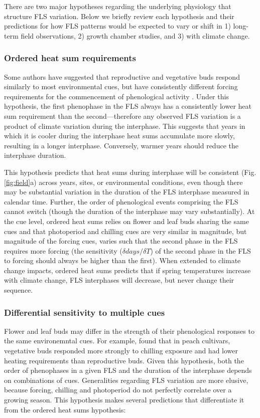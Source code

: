 \documentclass[11pt]{article}
\begin{document}
\noindent There are two major hypotheses regarding the underlying physiology that structure FLS variation. Below we briefly review each hypothesis and their predictions for how FLS patterns would be expected to vary or shift in 1) long-term field observations, 2) growth chamber studies, and 3) with climate change.

\subsubsection*{Ordered heat sum requirements}%
\noindent Some authors have suggested that reproductive and vegetative buds respond similarly to most environmental cues, but have consistently different forcing requirements for the commencement of phenological activity \citep{Guo_2014}. Under this hypothesis, the first phenophase in the FLS always has a consistently lower heat sum requirement than the second---therefore any observed FLS variation is a product of climate variation during the interphase. This suggests that years in which it is cooler during the interphase heat sums accumulate more slowly, resulting in a longer interphase. Conversely, warmer years should reduce the interphase duration. 

This hypothesis predicts that heat sums during interphase will be consistent (Fig. \ref{fig:field}a) across years, sites, or environmental conditions, even though there may be substantial variation in the duration of the FLS interphase measured in calendar time. Further, the order of phenological events comprising the FLS cannot switch (though the duration of the interphase may vary substantially). At the cue level, ordered heat sums relies on flower and leaf buds sharing the same cues and that photoperiod and chilling cues are very similar in magnitude, but magnitude of the forcing cues, varies such that the second phase in the FLS requires more forcing (the sensitivity ($\delta days/\delta T$) of the second phase in the FLS to forcing should always be higher than the first). When extended to climate change impacts, ordered heat sums predicts that if spring temperatures increase with climate change, FLS interphases will decrease, but never change their sequence.

\subsubsection*{Differential sensitivity to multiple cues}
 \noindent Flower and leaf buds may differ in the strength of their phenological responses to the same environemntal cues. For example, \citet{Garigalio2016} found that in peach cultivars, vegetative buds responded more strongly to chilling exposure and had lower heating requirements than reproductive buds. Given this hypothesis, both the order of phenophases in a given FLS and the duration of the interphase depends on combinations of cues. Generalities regarding FLS variation are more elusive, because forcing, chilling and photoperiod do not perfectly correlate over a growing season. This hypothesis makes several predictions that differentiate it from the ordered heat sums hypothesis:
\end{document}
